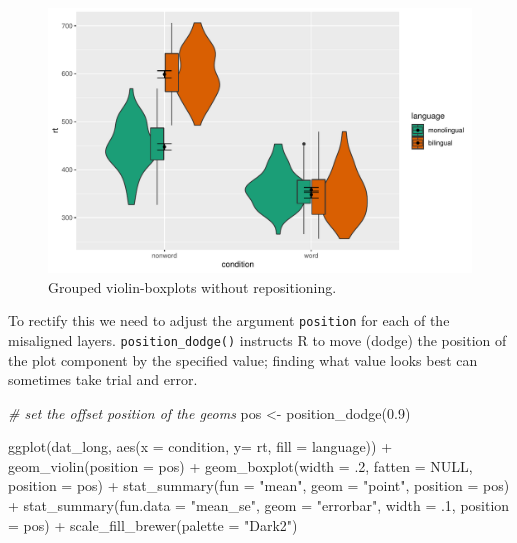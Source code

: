 \documentclass[
  english,
  doc,floatsintext]{apa6}
\newenvironment{Shaded}{\begin{snugshade}}{\end{snugshade}}
\newcommand{\AttributeTok}[1]{\textcolor[rgb]{0.77,0.63,0.00}{#1}}
\newcommand{\CommentTok}[1]{\textcolor[rgb]{0.56,0.35,0.01}{\textit{#1}}}
\newcommand{\ConstantTok}[1]{\textcolor[rgb]{0.00,0.00,0.00}{#1}}
\newcommand{\DecValTok}[1]{\textcolor[rgb]{0.00,0.00,0.81}{#1}}
\newcommand{\FloatTok}[1]{\textcolor[rgb]{0.00,0.00,0.81}{#1}}
\newcommand{\FunctionTok}[1]{\textcolor[rgb]{0.00,0.00,0.00}{#1}}
\newcommand{\NormalTok}[1]{#1}
\newcommand{\OtherTok}[1]{\textcolor[rgb]{0.56,0.35,0.01}{#1}}
\newcommand{\SpecialCharTok}[1]{\textcolor[rgb]{0.00,0.00,0.00}{#1}}
\newcommand{\StringTok}[1]{\textcolor[rgb]{0.31,0.60,0.02}{#1}}
\begin{document}
\begin{figure}

{\centering \includegraphics[width=1\linewidth]{images/viobox2-1} 

}

\caption{Grouped violin-boxplots without repositioning.}\label{fig:viobox2}
\end{figure}

To rectify this we need to adjust the argument \texttt{position} for each of the misaligned layers. \texttt{position\_dodge()} instructs R to move (dodge) the position of the plot component by the specified value; finding what value looks best can sometimes take trial and error.

\begin{Shaded}
\begin{Highlighting}[]
\CommentTok{\# set the offset position of the geoms}
\NormalTok{pos }\OtherTok{\textless{}{-}} \FunctionTok{position\_dodge}\NormalTok{(}\FloatTok{0.9}\NormalTok{)}

\FunctionTok{ggplot}\NormalTok{(dat\_long, }\FunctionTok{aes}\NormalTok{(}\AttributeTok{x =}\NormalTok{ condition, }\AttributeTok{y=}\NormalTok{ rt, }\AttributeTok{fill =}\NormalTok{ language)) }\SpecialCharTok{+}
  \FunctionTok{geom\_violin}\NormalTok{(}\AttributeTok{position =}\NormalTok{ pos) }\SpecialCharTok{+}
  \FunctionTok{geom\_boxplot}\NormalTok{(}\AttributeTok{width =}\NormalTok{ .}\DecValTok{2}\NormalTok{, }
               \AttributeTok{fatten =} \ConstantTok{NULL}\NormalTok{, }
               \AttributeTok{position =}\NormalTok{ pos) }\SpecialCharTok{+}
  \FunctionTok{stat\_summary}\NormalTok{(}\AttributeTok{fun =} \StringTok{"mean"}\NormalTok{, }
               \AttributeTok{geom =} \StringTok{"point"}\NormalTok{, }
               \AttributeTok{position =}\NormalTok{ pos) }\SpecialCharTok{+}
  \FunctionTok{stat\_summary}\NormalTok{(}\AttributeTok{fun.data =} \StringTok{"mean\_se"}\NormalTok{, }
               \AttributeTok{geom =} \StringTok{"errorbar"}\NormalTok{, }
               \AttributeTok{width =}\NormalTok{ .}\DecValTok{1}\NormalTok{,}
               \AttributeTok{position =}\NormalTok{ pos) }\SpecialCharTok{+}
  \FunctionTok{scale\_fill\_brewer}\NormalTok{(}\AttributeTok{palette =} \StringTok{"Dark2"}\NormalTok{)}
\end{Highlighting}
\end{Shaded}
\end{document}
